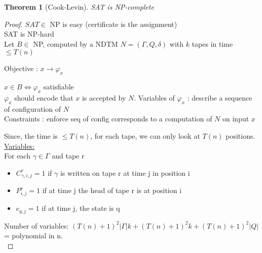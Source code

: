 \documentclass{article}
\newtheorem{theorem}{Theorem}
\theoremstyle{definition}
\theoremstyle{remark}
\begin{document}
\begin{theorem}[Cook-Levin]
	SAT is NP-complete
\end{theorem}
\begin{proof}
	$SAT \in$ NP is easy (certificate is the assignment)\\
	SAT is NP-hard\\
	Let $B \in$ NP, computed by a NDTM $N = (\Gamma, Q, \delta)$ with $k$ tapes in time $\leq T(n)$
	
	Objective :
		$x \rightarrow \varphi_x$
		
		$x \in B \Leftrightarrow \varphi_x$ satisfiable\\
		
	$\varphi_x$ should encode that $x$ is accepted by $N$.
	Variables of $\varphi_x$ : describe a sequence of configuration of $N$\\
	Constraints : enforce seq of config corresponds to a computation of $N$ on input $x$
	
	Since, the time is $\leq T(n)$, for each tape, we can only look at $T(n)$ positions.\\

	\underline{Variables:}\\
	For each $\gamma \in \Gamma$ and tape r
	\begin{itemize}
		\item $C^r_{\gamma,i,j} = 1$ if $\gamma$ is written on tape r at time j in position i
		\item $P^r_{i,j} = 1$ if at time j the head of tape r is at position i
		\item $e_{q,j} = 1$ if at time j, the state is q
	\end{itemize}
	Number of variables: $(T(n)+1)^2 |\Gamma| k + (T(n)+1)^2 k + (T(n)+1)^2 |Q|$ = polynomial in n.\\
	

\end{proof}
\end{document}
